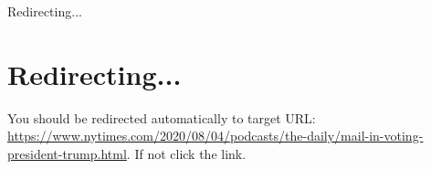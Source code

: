 Redirecting...

\hypertarget{redirecting}{%
\section{Redirecting...}\label{redirecting}}

You should be redirected automatically to target URL:
\url{https://www.nytimes.com/2020/08/04/podcasts/the-daily/mail-in-voting-president-trump.html}.
If not click the link.
